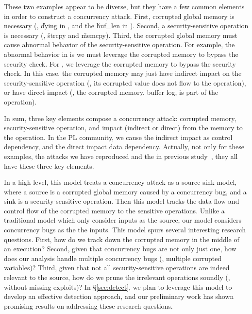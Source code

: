These two examples appear to be diverse, but they have a few common elements in 
order to construct a concurrency attack. First, corrupted global memory is 
necessary (\eg, \v{dying} in \libsafe, and the \v{buf\_len} in \apache). 
Second, a security-sensitive operation is necessary (\eg, \v{strcpy} and 
\v{memcpy}). Third, the corrupted global memory must cause abnormal behavior of 
the security-sensitive operation. For example, the abnormal behavior in \libsafe 
is we must leverage the corrupted memory to bypass the security check. For 
\apache, we leverage the corrupted memory to bypass the security check. In this 
case, the corrupted memory may just have indirect impact on the 
security-sensitive operation (\ie, its corrupted value does not flow to the 
operation), or have direct impact (\ie, the corrupted memory, buffer log, is 
part of the operation).

In sum, three key elements compose a concurrency attack: corrupted memory, 
security-sensitive operation, and impact (indirect or direct) from the memory 
to the operation. In the PL community, we cause the indirect impact as control 
dependency, and the direct impact data dependency. Actually, not only for these 
examples, the \nattacks attacks we have reproduced and the \noldattacks in 
previous study~\cite{con:hotpar12}, they all have these three key elements.

In a high level, this model treats a concurrency attack as a source-sink model, 
where a source is a corrupted global memory caused by a concurrency bug, and a 
sink is a security-sensitive operation. Then this model tracks the data flow 
and control flow of the corrupted memory to the sensitive operations. Unlike a 
traditional model which only consider inputs as the source, our model considers
concurrency bugs as the the inputs. This model spurs several interesting 
research questions. First, how do we track down the corrupted memory in the 
middle of an execution? Second, given that concurrency bugs are not only just 
one, how does our analysis handle multiple concurrency bugs (\eg, multiple 
corrupted variables)? Third, given that not all security-sensitive operations 
are indeed relevant to the source, how do we prune the irrelevant operations 
soundly (\ie, without missing exploits)? In \S\ref{sec:detect}, we plan to 
leverage this model to develop an effective detection approach, and our 
preliminary work has shown promising results on addressing these research 
questions.

